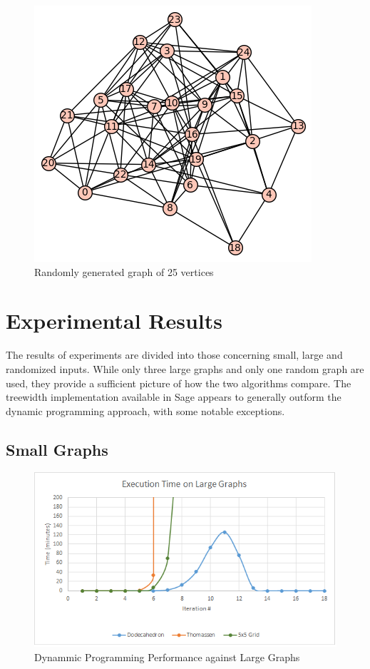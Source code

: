 \documentclass[12pt,conference]{IEEEtran}
\theoremstyle{plain}
\begin{document}
\begin{figure}
\caption{Randomly generated graph of 25 vertices}
\centering
\includegraphics[scale=0.75]{random-25}
\end{figure}

\section{Experimental Results}

The results of experiments are divided into those concerning small, large and randomized inputs. While only three large graphs and only one random graph are used, they provide a sufficient picture of how the two algorithms compare. The treewidth implementation available in Sage appears to generally outform the dynamic programming approach, with some notable exceptions.

\subsection{Small Graphs}

\begin{figure}[!bp]
\centering
\includegraphics[scale=1.0]{large-graph-metrics}
\caption{Dynammic Programming Performance against Large Graphs}
\end{figure}
\end{document}
